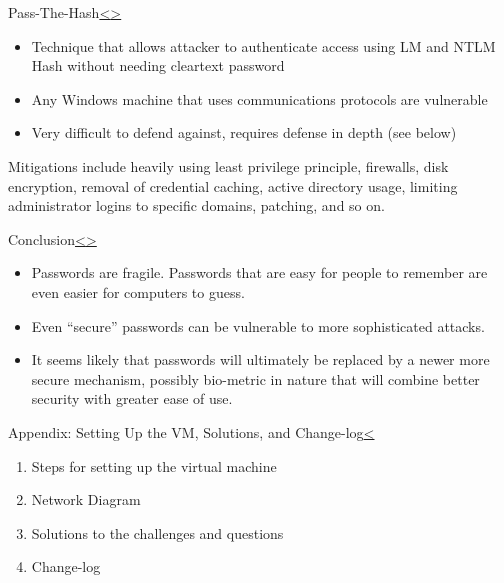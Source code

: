 \documentclass[12pt]{article}
\newenvironment{instructionblock}{\Large\bgroup}{\egroup}
\newcommand{\bi}{\begin{itemize}}
\newcommand{\ei}{\end{itemize}}
\begin{document}
\pagebreak
\begin{slide}{Pass-The-Hash\cite{passthehash}}{\hyperref[slide 24]{\textless}\hyperref[slide 26]{\textgreater}}
	\begin{instructionblock}
			\bi
				\item Technique that allows attacker to authenticate access using LM and NTLM Hash without needing cleartext password
				\item Any Windows machine that uses communications protocols are vulnerable
				\item Very difficult to defend against, requires defense in depth (see below)
			\ei
	\end{instructionblock}
\end{slide}
Mitigations include heavily using least privilege principle, firewalls, disk encryption, removal of credential caching, active directory usage, limiting administrator logins to specific domains, patching, and so on.
\pagebreak
\begin{slide}{Conclusion}{\hyperref[slide 25]{\textless}\hyperref[slide 27]{\textgreater}}
\begin{instructionblock}
\begin{itemize}
\item Passwords are fragile.  Passwords that are easy for people to remember are even easier for computers to guess.
\item Even ``secure'' passwords can be vulnerable to more sophisticated attacks.
\item It seems likely that passwords will ultimately be replaced by a newer more secure mechanism, possibly bio-metric in nature that will combine better security with greater ease of use.
\end{itemize}
\end{instructionblock}
\end{slide}
\vfill

\pagebreak

\begin{slide}{Appendix: Setting Up the VM, Solutions, and Change-log}{\hyperref[slide 26]{\textless}}
	\begin{instructionblock}
		\begin{enumerate}
			\item {Steps for setting up the virtual machine}
			\item {Network Diagram}
			\item {Solutions to the challenges and questions}
				
			\item {Change-log}
		\end{enumerate}
	\end{instructionblock}
\end{slide}
\end{document}
